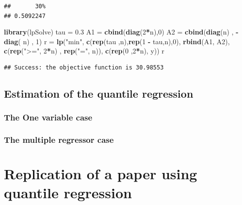 \documentclass[]{book}
\newenvironment{Shaded}{\begin{snugshade}}{\end{snugshade}}
\newcommand{\KeywordTok}[1]{\textcolor[rgb]{0.13,0.29,0.53}{\textbf{#1}}}
\newcommand{\DecValTok}[1]{\textcolor[rgb]{0.00,0.00,0.81}{#1}}
\newcommand{\FloatTok}[1]{\textcolor[rgb]{0.00,0.00,0.81}{#1}}
\newcommand{\StringTok}[1]{\textcolor[rgb]{0.31,0.60,0.02}{#1}}
\newcommand{\OperatorTok}[1]{\textcolor[rgb]{0.81,0.36,0.00}{\textbf{#1}}}
\newcommand{\NormalTok}[1]{#1}
\begin{document}
\begin{verbatim}
##       30% 
## 0.5092247
\end{verbatim}

\begin{Shaded}
\begin{Highlighting}[]
\KeywordTok{library}\NormalTok{(lpSolve)}
\NormalTok{tau =}\StringTok{ }\FloatTok{0.3}
\NormalTok{A1 =}\StringTok{ }\KeywordTok{cbind}\NormalTok{(}\KeywordTok{diag}\NormalTok{(}\DecValTok{2}\OperatorTok{*}\NormalTok{n),}\DecValTok{0}\NormalTok{)}
\NormalTok{A2 =}\StringTok{ }\KeywordTok{cbind}\NormalTok{(}\KeywordTok{diag}\NormalTok{(n) , }\OperatorTok{-}\KeywordTok{diag}\NormalTok{( n) , }\DecValTok{1}\NormalTok{)}
\NormalTok{r =}\StringTok{ }\KeywordTok{lp}\NormalTok{(}\StringTok{"min"}\NormalTok{, }
       \KeywordTok{c}\NormalTok{(}\KeywordTok{rep}\NormalTok{(tau ,n),}\KeywordTok{rep}\NormalTok{(}\DecValTok{1} \OperatorTok{-}\StringTok{ }\NormalTok{tau,n),}\DecValTok{0}\NormalTok{),}
       \KeywordTok{rbind}\NormalTok{(A1, A2),}
       \KeywordTok{c}\NormalTok{(}\KeywordTok{rep}\NormalTok{(}\StringTok{">="}\NormalTok{, }\DecValTok{2}\OperatorTok{*}\NormalTok{n) , }\KeywordTok{rep}\NormalTok{(}\StringTok{"="}\NormalTok{, n)),}
       \KeywordTok{c}\NormalTok{(}\KeywordTok{rep}\NormalTok{(}\DecValTok{0}\NormalTok{ ,}\DecValTok{2}\OperatorTok{*}\NormalTok{n), y))}
\NormalTok{r}
\end{Highlighting}
\end{Shaded}

\begin{verbatim}
## Success: the objective function is 30.98553
\end{verbatim}

\subsection{Estimation of the quantile
regression}\label{estimation-of-the-quantile-regression}

\subsubsection{The One variable case}\label{the-one-variable-case}

\subsubsection{The multiple regressor
case}\label{the-multiple-regressor-case}

\section{Replication of a paper using quantile
regression}\label{replication-of-a-paper-using-quantile-regression}
\end{document}
